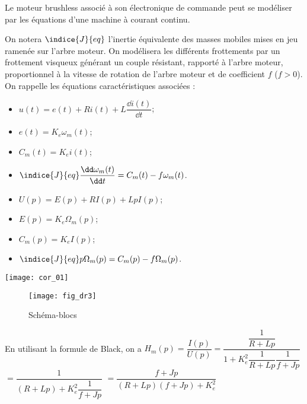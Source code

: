 \begin{multicols}{2}
Le moteur brushless associé à son électronique de commande peut se modéliser par les équations d’une machine à courant continu. 


On notera $\indice{J}{eq}$ l’inertie équivalente des masses mobiles mises en jeu ramenée sur l’arbre moteur. On
modélisera les différents frottements par un frottement visqueux générant un couple résistant, rapporté
à l’arbre moteur, proportionnel à la vitesse de rotation de l’arbre moteur et de coefficient $f$ ($f > 0$).
On rappelle les équations caractéristiques associées :
\begin{itemize}
\item $u(t) = e(t)+Ri(t)+L\dfrac{\dd i(t)}{\dd t}$;
\item $e(t)=K_e\omega_m(t)$;
\item $C_m(t)=K_e i(t)$;
\item $\indice{J}{eq} \dfrac{\dd \omega_m(t)}{\dd t} = C_m(t)-f\omega_m(t)$.
\end{itemize}
\fi


\ifprof
\begin{corrige}
\begin{itemize}
\item $U(p) = E(p)+RI(p)+Lp I(p)$;
\item $E(p)=K_e\Omega_m(p)$;
\item $C_m(p)=K_e I(p)$;
\item $\indice{J}{eq} p\Omega_m(p) = C_m(p)-f\Omega_m(p)$.
\end{itemize}
\end{corrige}
\else
\fi

\ifprof
\begin{corrige}
\begin{center}
\texttt{[image: cor\_01]}
\end{center}
\end{corrige}
\else
\fi

\ifprof
\else
\begin{figure}[H]
\centering
\texttt{[image: fig\_dr3]}
\caption{Schéma-blocs \label{fig_dr3}}
\end{figure}
\fi

\ifprof
\begin{corrige}
En utilisant la formule de Black, on a 
$H_m(p)=\dfrac{I(p)}{U(p)} = \dfrac{\dfrac{1}{R+Lp}}{1+K_e^2 \dfrac{1}{R+Lp} \dfrac{1}{f+Jp}}$
$ = \dfrac{1}{\left(R+Lp\right)+K_e^2 \dfrac{1}{f+Jp}}$
$ = \dfrac{f+Jp}{\left(R+Lp\right)\left(f+Jp\right)+K_e^2 }$


\end{corrige}
\end{multicols}
